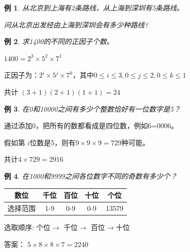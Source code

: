 \documentclass[13pt, punct]{ctexbeamer}
\newtheorem{ex}{例}[section]
\begin{document}
\begin{frame}
\begin{ex}
	从北京到上海有2条路线，从上海到深圳有5条路线。

	问从北京出发经由上海到深圳会有多少种路线?
\end{ex}

\begin{ex}
	求1400的不同的正因子个数。
\end{ex}
\pause
	$1400=2^3 \times 5^2 \times 7^1$

正因子为：$2^i \times 5^j \times 7^k$，其中$0 \le i \le 3, 0 \le j \le 2, 0\le k\le 1$

共计 $(3+1)(2+1)(1+1)=24$
\end{frame}

\begin{frame}
\begin{ex}
	在0和10000之间有多少个整数恰好有一位数字是5？
\end{ex}
\pause
通过添加0，把所有的数都看成是四位数，例如6=0006。

假如第 $i$位数是5，则有$9\times 9 \times 9=729$种可能。

共计$4 \times 729=2916$
\end{frame}



\begin{frame}
\begin{ex}
	在1000和9999之间各位数字不同的奇数有多少个？
\end{ex}
\pause
\begin{center}
	\begin{tabular}{|c|c|c|c|c|}\hline
		数位& 千位&百位& 十位& 个位\\ \hline
		选择范围& 1-9 &0-9& 0-9& 13579\\ \hline
	\end{tabular}
\end{center}
\pause
选取顺序: \pause 个位$\rightarrow$ 千位$\rightarrow$ 百位$\rightarrow$十位

\pause
答案： $5\times 8 \times 8 \times 7=2240$
\end{frame}
\end{document}
